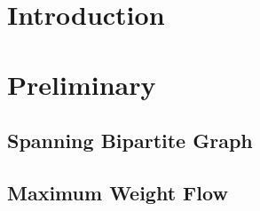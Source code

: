 \begin{abstract}

\end{abstract}

\section{Introduction}


\section{Preliminary}


	\subsection{Spanning Bipartite Graph}
	
	
	\subsection{Maximum Weight Flow}
	

% 

\section{\FIXEDCARPOOL{}}


\section{\UWCARPOOL{}}


\section{\UCCARPOOL{}}


\section{\CARPOOL{}}

